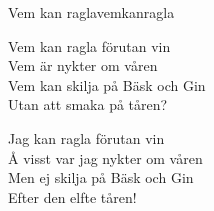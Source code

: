 \begin{song}{Vem kan ragla}{vemkanragla}
\begin{vers}
Vem kan ragla förutan vin\\
Vem är nykter om våren\\
Vem kan skilja på Bäsk och Gin\\
Utan att smaka på tåren?\\
\end{vers}
\begin{vers}
Jag kan ragla förutan vin\\
Å visst var jag nykter om våren\\
Men ej skilja på Bäsk och Gin\\
Efter den elfte tåren!\\
\end{vers}
\end{song}
